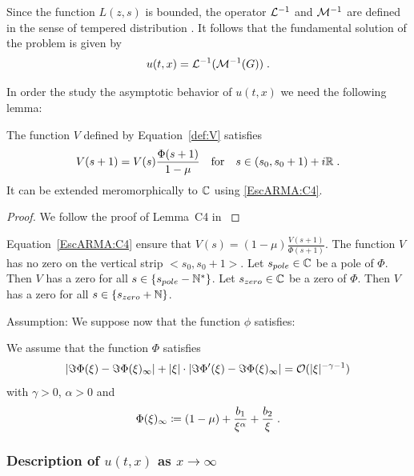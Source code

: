 Since the function $L(z,s)$ is bounded, the operator $\mathcal{L}^{-1}$ and $ \mathcal{M}^{-1}$ are defined in the sense of tempered distribution \cite{misra1986transform}. It follows that the fundamental solution of the problem is given by 
    \begin{equation}
        u(t,x) = \mathcal{L}^{-1} (\mathcal{M}^{-1} (G))
        \; .
    \end{equation}
    
In order the study the asymptotic behavior of $u(t,x)$ we need the following lemma: 
\begin{lemma}The function $V$ defined by Equation~\eqref{def:V} satisfies
    \begin{equation}
        V(s+1) = V(s)\frac{\Phi(s+1)}{1-\mu}
        \quad \text{for} \quad
        s \in (s_0, s_0+1) + i\mathbb{R}
        \; .
        \label{EscARMA:C4}
    \end{equation}
It can be extended meromorphically to $\mathbb{C}$ using \eqref{EscARMA:C4}.
\end{lemma}
\begin{proof}
We follow the proof of Lemma~C4 in \cite{escobedo2007fundamental}
\end{proof}

\begin{remark}
    Equation~\eqref{EscARMA:C4} ensure that $V(s) = (1-\mu)\frac{V(s+1)}{\Phi(s+1)}$. 
    The function $V$ has no zero on the vertical strip $<s_0, s_0+1>$. Let $s_{pole} \in \mathbb{C}$ be a pole of $\Phi$. Then $V$ has a zero for all $s \in \{s_{pole} - \mathbb{N}^* \}$.
    Let $s_{zero} \in \mathbb{C}$ be a zero of $\Phi$. Then $V$ has a zero for all 
    $s \in \{s_{zero} + \mathbb{N}\}$. 
\end{remark}

Assumption: We suppose now that the function $\phi$ satisfies:
\begin{hypothesis}
    \label{ARMA_P3}
    We assume that the function $\Phi$ satisfies
    $$ |\Im \Phi(\xi) - \Im \Phi(\xi)_\infty| + |\xi|\cdot | \Im \Phi'(\xi) - \Im \Phi(\xi)_\infty| = \mathcal{O}(|\xi|^{-\gamma-1}) $$
    with $\gamma > 0$, $\alpha > 0$ and 
    $$ \Phi(\xi)_\infty \coloneqq (1-\mu) + \frac{b_1}{\xi^\alpha} + \frac{b_2}{\xi} \; .$$ 
\end{hypothesis}


    
\subsubsection{Description of $u(t,x)$ as $x \to \infty$}\text{\\}

